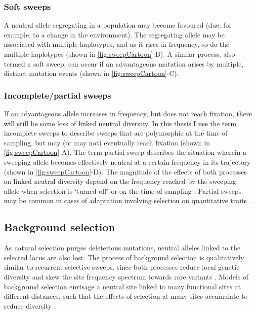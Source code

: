 \subsubsection{Soft sweeps} 
  
A neutral allele segregating in a population may become favoured (due, for example, to a change in the environment). The segregating allele may be associated with multiple haplotypes, and as it rises in frequency, so do the multiple haplotypes (shown in \ref{fig:sweepCartoon}-B). A similar process, also termed a soft sweep, can occur if an advantageous mutation arises by multiple, distinct mutation events (shown in \ref{fig:sweepCartoon}-C). 
 
\subsubsection{Incomplete/partial sweeps} 
 
If an advantageous allele increases in frequency, but does not reach fixation, there will still be some loss of linked neutral diversity. In this thesis I use the term incomplete sweeps to describe sweeps that are polymorphic at the time of sampling, but may (or may not) eventually reach fixation (shown in \ref{fig:sweepCartoon}-A). The term partial sweep describes the situation wherein a sweeping allele becomes effectively neutral at a certain frequency in its trajectory (shown in \ref{fig:sweepCartoon}-D). The magnitude of the effects of both processes on linked neutral diversity depend on the frequency reached by the sweeping allele when selection is `turned off' or on the time of sampling \citep{RN226}. Partial sweeps may be common in cases of adaptation involving selection on quantitative traits \citep{RN147}. 

\subsection{Background selection} 
As natural selection purges deleterious mutations, neutral alleles linked to the selected locus are also lost. The process of background selection is qualitatively similar to recurrent selective sweeps, since both processes reduce local genetic diversity \citep{RN110} and skew the site frequency spectrum towards rare variants \citep{RN287, RN234}. Models of background selection envisage a neutral site linked to many functional sites at different distances, such that the effects of selection at many sites accumulate to reduce diversity \citep{RN206,RN157}. 

